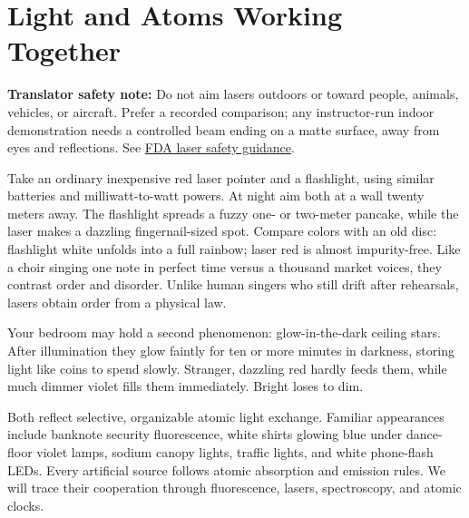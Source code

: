 \chapter{Light and Atoms Working Together}


\begin{mainline}
\textbf{Translator safety note:} Do not aim lasers outdoors or toward people, animals, vehicles, or aircraft. Prefer a recorded comparison; any instructor-run indoor demonstration needs a controlled beam ending on a matte surface, away from eyes and reflections. See \href{https://www.fda.gov/consumers/consumer-updates/laser-toys-how-keep-kids-safe}{FDA laser safety guidance}.

Take an ordinary inexpensive red laser pointer and a flashlight, using similar batteries and milliwatt-to-watt powers. At night aim both at a wall twenty meters away. The flashlight spreads a fuzzy one- or two-meter pancake, while the laser makes a dazzling fingernail-sized spot. Compare colors with an old disc: flashlight white unfolds into a full rainbow; laser red is almost impurity-free. Like a choir singing one note in perfect time versus a thousand market voices, they contrast order and disorder. Unlike human singers who still drift after rehearsals, lasers obtain order from a physical law.

Your bedroom may hold a second phenomenon: glow-in-the-dark ceiling stars. After illumination they glow faintly for ten or more minutes in darkness, storing light like coins to spend slowly. Stranger, dazzling red hardly feeds them, while much dimmer violet fills them immediately. Bright loses to dim.

Both reflect selective, organizable atomic light exchange. Familiar appearances include banknote security fluorescence, white shirts glowing blue under dance-floor violet lamps, sodium canopy lights, traffic lights, and white phone-flash LEDs. Every artificial source follows atomic absorption and emission rules. We will trace their cooperation through fluorescence, lasers, spectroscopy, and atomic clocks.
\end{mainline}


